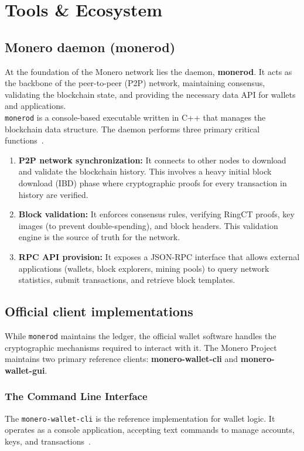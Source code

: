 \documentclass[conference]{IEEEtran}
\begin{document}

\section{Tools \& Ecosystem}
\subsection{Monero daemon (monerod)}
At the foundation of the Monero network lies the daemon, \textbf{monerod}. It acts as the backbone of the peer-to-peer (P2P) network, maintaining consensus, validating the blockchain state, and providing the necessary data API for wallets and applications.\\
\texttt{monerod} is a console-based executable written in C++ that manages the blockchain data structure. The daemon performs three primary critical functions~\cite{monerod}.
\begin{enumerate}
\item \textbf{P2P network synchronization:} It connects to other nodes to download and validate the blockchain history. This involves a heavy initial block download (IBD) phase where cryptographic proofs for every transaction in history are verified.
\item \textbf{Block validation:} It enforces consensus rules, verifying RingCT proofs, key images (to prevent double-spending), and block headers. This validation engine is the source of truth for the network.
\item \textbf{RPC API provision:} It exposes a JSON-RPC interface that allows external applications (wallets, block explorers, mining pools) to query network statistics, submit transactions, and retrieve block templates.
\end{enumerate}

\subsection{Official client implementations}
While \texttt{monerod} maintains the ledger, the official wallet software handles the cryptographic mechanisms required to interact with it. The Monero Project maintains two primary reference clients: \textbf{monero-wallet-cli} and \textbf{monero-wallet-gui}.
\subsubsection{The Command Line Interface}
The \texttt{monero-wallet-cli} is the reference implementation for wallet logic. It operates as a console application, accepting text commands to manage accounts, keys, and transactions~\cite{monero_wallet_cli}.
\end{document}
